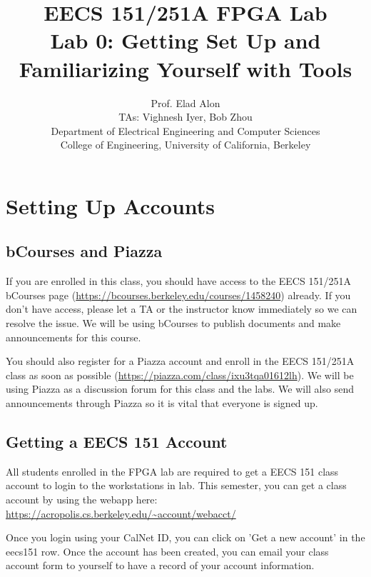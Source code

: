 \documentclass[11pt]{article}
\begin{document}
\title{EECS 151/251A FPGA Lab\\
Lab 0: Getting Set Up and Familiarizing Yourself with Tools}

\author{Prof. Elad Alon \\
TAs: Vighnesh Iyer, Bob Zhou \\Department of Electrical Engineering and Computer Sciences\\
College of Engineering, University of California, Berkeley}
\date{}
\maketitle

\section{Setting Up Accounts}

\subsection{bCourses and Piazza}
If you are enrolled in this class, you should have access to the EECS 151/251A bCourses page (\url{https://bcourses.berkeley.edu/courses/1458240}) already. If you don't have access, please let a TA or the instructor know immediately so we can resolve the issue. We will be using bCourses to publish documents and make announcements for this course.

You should also register for a Piazza account and enroll in the EECS 151/251A class as soon as possible (\url{https://piazza.com/class/ixu3tqa01612lh}). We will be using Piazza as a discussion forum for this class and the labs. We will also send announcements through Piazza so it is vital that everyone is signed up.

\subsection{Getting a EECS 151 Account}
All students enrolled in the FPGA lab are required to get a EECS 151 class account to login to the workstations in lab. This semester, you can get a class account by using the webapp here:
\url{https://acropolis.cs.berkeley.edu/~account/webacct/}

Once you login using your CalNet ID, you can click on 'Get a new account' in the eecs151 row. Once the account has been created, you can email your class account form to yourself to have a record of your account information.
\end{document}

